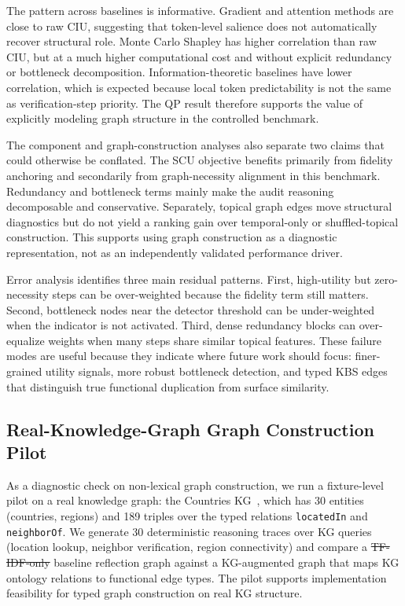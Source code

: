 \documentclass[a4paper,fleqn]{cas-sc}
\makeatletter
\newcommand{\tfidf}{\mbox{TF-IDF}} %
\providecommand{\DIFaddtex}[1]{{\protect\color{blue}\uwave{#1}}} %
\providecommand{\DIFdeltex}[1]{{\protect\color{red}\sout{#1}}} %
\providecommand{\DIFaddbegin}{} %
\providecommand{\DIFaddend}{} %
\providecommand{\DIFdelbegin}{} %
\providecommand{\DIFdelend}{} %
\providecommand{\DIFadd}[1]{\texorpdfstring{\DIFaddtex{#1}}{#1}} %
\providecommand{\DIFdel}[1]{\texorpdfstring{\DIFdeltex{#1}}{}} %
\providecommand{\DIFscaledelfig}{0.5}
\newlength{\DIFdelgraphicswidth} %
\newlength{\DIFdelgraphicsheight} %
\providecommand{\DIFaddincludegraphics}[2][]{{\color{blue}\fbox{\DIFOincludegraphics[#1]{#2}}}} %
\providecommand{\DIFdelincludegraphics}[2][]{%
\sbox{\DIFdelgraphicsbox}{\DIFOincludegraphics[#1]{#2}}%
\settoboxwidth{\DIFdelgraphicswidth}{\DIFdelgraphicsbox} %
\settoboxtotalheight{\DIFdelgraphicsheight}{\DIFdelgraphicsbox} %
\scalebox{\DIFscaledelfig}{%
\parbox[b]{\DIFdelgraphicswidth}{\usebox{\DIFdelgraphicsbox}\\[-\baselineskip] \rule{\DIFdelgraphicswidth}{0em}}\llap{\resizebox{\DIFdelgraphicswidth}{\DIFdelgraphicsheight}{%
\setlength{\unitlength}{\DIFdelgraphicswidth}%
\begin{picture}(1,1)%
\thicklines\linethickness{2pt} %
{\color[rgb]{1,0,0}\put(0,0){\framebox(1,1){}}}%
{\color[rgb]{1,0,0}\put(0,0){\line( 1,1){1}}}%
{\color[rgb]{1,0,0}\put(0,1){\line(1,-1){1}}}%
\end{picture}%
}\hspace*{3pt}}} %
} %
\DeclareRobustCommand{\DIFaddbegin}{\DIFOaddbegin \let\includegraphics\DIFaddincludegraphics} %
\DeclareRobustCommand{\DIFaddend}{\DIFOaddend \let\includegraphics\DIFOincludegraphics} %
\DeclareRobustCommand{\DIFdelbegin}{\DIFOdelbegin \let\includegraphics\DIFdelincludegraphics} %
\DeclareRobustCommand{\DIFdelend}{\DIFOaddend \let\includegraphics\DIFOincludegraphics} %
\let\sout@orig\sout %
\renewcommand{\sout}[1]{\ifmmode\text{\sout@orig{\ensuremath{#1}}}\else\sout@orig{#1}\fi} %
\makeatother
\begin{document}
The pattern across baselines is informative. Gradient and attention methods are close to raw CIU, suggesting that token-level salience does not automatically recover structural role. Monte Carlo Shapley has higher correlation than raw CIU, but at a much higher computational cost and without explicit redundancy or bottleneck decomposition. Information-theoretic baselines have lower correlation, which is expected because local token predictability is not the same as verification-step priority. The QP result therefore supports the value of explicitly modeling graph structure in the controlled benchmark.

The component and graph-construction analyses also separate two claims that could otherwise be conflated. The SCU objective benefits primarily from fidelity anchoring and secondarily from graph-necessity alignment in this benchmark. Redundancy and bottleneck terms mainly make the audit reasoning decomposable and conservative. Separately, topical graph edges move structural diagnostics but do not yield a ranking gain over temporal-only or shuffled-topical construction. This supports using graph construction as a diagnostic representation, not as an independently validated performance driver.

Error analysis identifies three main residual patterns. First, high-utility but zero-necessity steps can be over-weighted because the fidelity term still matters. Second, bottleneck nodes near the detector threshold can be under-weighted when the indicator is not activated. Third, dense redundancy blocks can over-equalize weights when many steps share similar topical features. These failure modes are useful because they indicate where future work should focus: finer-grained utility signals, more robust bottleneck detection, and typed KBS edges that distinguish true functional duplication from surface similarity.

\subsection{Real-Knowledge-Graph Graph Construction Pilot}
\label{sec:kg-pilot}

As a diagnostic check on non-lexical graph construction, we run a fixture-level pilot on a real knowledge graph: the Countries KG~\cite{bordes2013translating}, which has 30 entities (countries, regions) and 189 triples over the typed relations \texttt{locatedIn} and \texttt{neighborOf}. We generate 30 deterministic reasoning traces over KG queries (location lookup, neighbor verification, region connectivity) and compare a \DIFdelbegin \DIFdel{TF-IDF-only }\DIFdelend \DIFaddbegin \DIFadd{\tfidf{}-only }\DIFaddend baseline reflection graph against a KG-augmented graph that maps KG ontology relations to functional edge types. The pilot supports implementation feasibility for typed graph construction on real KG structure.
\end{document}
